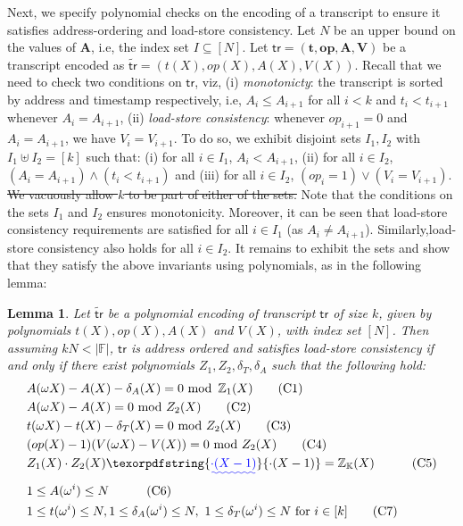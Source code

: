 \documentclass[sigconf]{acmart}
\newtheorem{lemma}{Lemma}[section]
\renewcommand{\vec}{\mathbf} %
\newcommand{\setind}{I}
\newcommand{\op}{{op}} %
\newcommand{\setH}{\mathbb{K}}
\newcommand{\F}{\mathbb{F}}
\newcommand{\wt}[1]{\widetilde{#1}}
\newcommand{\tr}{\ensuremath{\mathsf{tr}}}
\providecommand{\DIFaddtex}[1]{{\protect\color{blue}\uwave{#1}}} %
\providecommand{\DIFdeltex}[1]{{\protect\color{red}\sout{#1}}}                      %
\providecommand{\DIFaddbegin}{} %
\providecommand{\DIFaddend}{} %
\providecommand{\DIFdelbegin}{} %
\providecommand{\DIFdelend}{} %
\providecommand{\DIFadd}[1]{\texorpdfstring{\DIFaddtex{#1}}{#1}} %
\providecommand{\DIFdel}[1]{\texorpdfstring{\DIFdeltex{#1}}{}} %
\newcommand{\DIFscaledelfig}{0.5}
\newlength{\DIFdelgraphicswidth} %
\newlength{\DIFdelgraphicsheight} %
\newcommand{\DIFaddincludegraphics}[2][]{{\color{blue}\fbox{\DIFOincludegraphics[#1]{#2}}}} %
\newcommand{\DIFdelincludegraphics}[2][]{%
	\sbox{\DIFdelgraphicsbox}{\DIFOincludegraphics[#1]{#2}}%
	\settoboxwidth{\DIFdelgraphicswidth}{\DIFdelgraphicsbox} %
	\settoboxtotalheight{\DIFdelgraphicsheight}{\DIFdelgraphicsbox} %
	\scalebox{\DIFscaledelfig}{%
		\parbox[b]{\DIFdelgraphicswidth}{\usebox{\DIFdelgraphicsbox}\\[-\baselineskip] \rule{\DIFdelgraphicswidth}{0em}}\llap{\resizebox{\DIFdelgraphicswidth}{\DIFdelgraphicsheight}{%
				\setlength{\unitlength}{\DIFdelgraphicswidth}%
				\begin{picture}(1,1)%
					\thicklines\linethickness{2pt} %
					{\color[rgb]{1,0,0}\put(0,0){\framebox(1,1){}}}%
					{\color[rgb]{1,0,0}\put(0,0){\line( 1,1){1}}}%
					{\color[rgb]{1,0,0}\put(0,1){\line(1,-1){1}}}%
				\end{picture}%
			}\hspace*{3pt}}} %
} %
\DeclareRobustCommand{\DIFaddbegin}{\DIFOaddbegin \let\includegraphics\DIFaddincludegraphics} %
\DeclareRobustCommand{\DIFaddend}{\DIFOaddend \let\includegraphics\DIFOincludegraphics} %
\DeclareRobustCommand{\DIFdelbegin}{\DIFOdelbegin \let\includegraphics\DIFdelincludegraphics} %
\DeclareRobustCommand{\DIFdelend}{\DIFOaddend \let\includegraphics\DIFOincludegraphics} %
\begin{document}
		
		Next, we specify polynomial checks on the encoding of a transcript to ensure it satisfies address-ordering and load-store consistency.
		Let $N$ be an upper bound on the values of $\vec{A}$, i.e, the index set $\setind\subseteq [N]$.
		Let $\tr=(\vec{t},\vec{\op},\vec{A},\vec{V})$ be a transcript encoded as
		$\wt{\tr}=(t(X),\op(X),A(X),V(X))$. Recall that we need to check two conditions on $\tr$, viz, (i) {\em monotonicty}:
		the transcript is sorted by address and timestamp respectively, i.e, $A_i\leq A_{i+1}$ for all $i < k$ and
		$t_i < t_{i+1}$ whenever $A_i=A_{i+1}$, (ii) {\em load-store consistency}: whenever $\op_{i+1}=0$ and $A_i=A_{i+1}$,
		we have $V_i=V_{i+1}$.
		To do so, we exhibit disjoint sets $I_1,I_2$ with \DIFdelbegin \DIFdel{$I_1\uplus I_2=[k]$ }\DIFdelend \DIFaddbegin \DIFadd{$I_1\uplus I_2=[k-1]$ }\DIFaddend such that: (i) for all
		$i\in I_1$, $A_i < A_{i+1}$, (ii) for all $i\in I_2$, $(A_i = A_{i+1})\wedge (t_i < t_{i+1})$ and (iii) for all $i\in I_2$,
		$(\op_i=1)\vee (V_i = V_{i+1})$.
		\DIFdelbegin \DIFdel{We vacuously allow $k$ to be part of either of the sets.
		}\DIFdelend Note that the conditions on the sets $I_1$ and $I_2$ ensures monotonicity.
		Moreover, it can be seen that load-store consistency requirements are satisfied for all $i\in I_1$ (as $A_i\neq A_{i+1}$).
		Similarly,load-store consistency also holds for all $i\in I_2$.
		It remains to exhibit the sets and show that they satisfy the above invariants using polynomials, as in the following
		lemma:
		\begin{lemma}\label{lem:addr-ordered-transcript}
			Let $\wt{\tr}$ be a polynomial encoding of transcript $\tr$ of size $k$, given by polynomials $t(X),\op(X),A(X)$ and $V(X)$,
			with index set $[N]$. Then assuming $kN<|\F|$, $\tr$ is address ordered and satisfies load-store consistency if and only if there exist polynomials
			$Z_1,Z_2,\delta_T,\delta_A$
			such that the following hold:
			\begin{align}%
				& A(\omega X) - A(X) - \delta_A(X)= 0 \text{ mod }\, \mathbb{Z}_1(X) \tag{C1} \label{eq:C1} \\
				& A(\omega X) - A(X) = 0  \text{ mod } Z_2(X) \tag{C2} \label{eq:C2} \\
				& t(\omega X) - t(X) - \delta_T(X) = 0  \text{ mod } Z_2(X) \tag{C3} \label{eq:C3} \\
				& (\op(X) - 1)(V(\omega X) - V(X)) = 0  \text{ mod } Z_2(X) \tag{C4} \label{eq:C4} \\
				& Z_1(X)\cdot Z_2(X)\DIFaddbegin \DIFadd{\cdot (X-1) }\DIFaddend = \mathbb{Z}_\setH(X) \quad  \tag{C5} \label{eq:C5} \\
				& 1\leq A(\omega^i) \leq N  \quad \tag{C6} \label{eq:C6} \\
				& 1\leq t(\omega^i) \leq N, 1\leq \delta_A(\omega^i)\leq N,\ 1\leq \delta_T(\omega^i)\leq N \text{ for } i\in [k] \tag{C7} \label{eq:C7}
			\end{align}
		\end{lemma}
\end{document}
